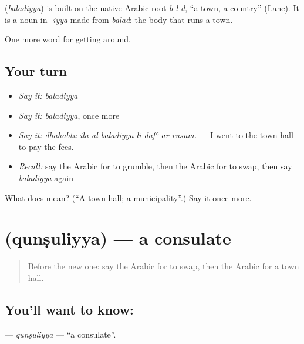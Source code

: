 \begin{cousinweb}
\textbf{} (\emph{baladiyya}) is built on the native Arabic root \emph{b-l-d}, \textquotedblleft{}a town, a country\textquotedblright{} (Lane). It is a noun in \emph{-iyya} made from \emph{balad}: the body that runs a town.
\end{cousinweb}

\begin{grammarlens}[title={What you've built}]
One more word for getting around.
\end{grammarlens}

\subsection*{Your turn}
\begin{itemize}
\raggedright
  \item \emph{Say it:} \emph{baladiyya}
  \item \emph{Say it:} \emph{baladiyya}, once more
  \item \emph{Say it:} \emph{dhahabtu ilā al-baladiyya li-dafʿ ar-rusūm.} — I went to the town hall to pay the fees.
  \item \emph{Recall:} say the Arabic for to grumble, then the Arabic for to swap, then say \emph{baladiyya} again
\end{itemize}

\begin{tcolorbox}[breakable,colback=teal!4,colframe=teal!35!black,title={Before you move on}]
What does  mean? (\textquotedblleft{}A town hall; a municipality\textquotedblright{}.) Say it once more.
\end{tcolorbox}
\section[\texorpdfstring{\ar{قنصلية} (qunṣuliyya)}{قنصلية (qunṣuliyya)}]{ (qunṣuliyya) — a consulate}

\label{lesson:AR-C450-qunsuliyya}



\begin{quote}
Before the new one: say the Arabic for to swap, then the Arabic for a town hall.
\end{quote}

\subsection*{You'll want to know: }
\textbf{} — \emph{qunṣuliyya} — \textquotedblleft{}a consulate\textquotedblright{}.

